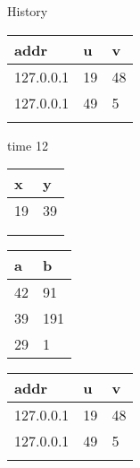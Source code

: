 \begin{block}{History}
\begin{center}
\begin{minipage}{0.3\textwidth}
      \vspace{0.5cm}

      \begin{tabularx}{\textwidth}{|X|l|l|}
        \hline\rowcolor{blue!20}
        \textbf{addr}  & \textbf{u} & \textbf{v} \\\hline
        127.0.0.1 & 19         & 48 \\\hline
        127.0.0.1 & 49         & 5 \\\hline
                  &            &   \\\hline
      \end{tabularx}
    \end{minipage}
    \hfill
    \begin{minipage}{0.3\textwidth}
      time 12

      \vspace{0.5cm}

      \begin{tabularx}{0.47\textwidth}{|X|X|}
        \hline\rowcolor{red!20}
        \textbf{x} & \textbf{y} \\\hline
        19         & 39 \\\hline
                   &   \\\hline
                   &    \\\hline
      \end{tabularx}
      \hfill
      \begin{tabularx}{0.47\textwidth}{|X|X|}
        \hline\rowcolor{green!20}
        \textbf{a} & \textbf{b} \\\hline
        42          & 91 \\\hline
        39         & 191 \\\hline
        29         & 1 \\\hline
      \end{tabularx}

      \vspace{0.5cm}

      \begin{tabularx}{\textwidth}{|X|l|l|}
        \hline\rowcolor{blue!20}
        \textbf{addr}  & \textbf{u} & \textbf{v} \\\hline
        127.0.0.1 & 19         & 48 \\\hline
        127.0.0.1 & 49         & 5 \\\hline
                  &            &   \\\hline
      \end{tabularx}
    \end{minipage}
  \end{center}
\end{block}
